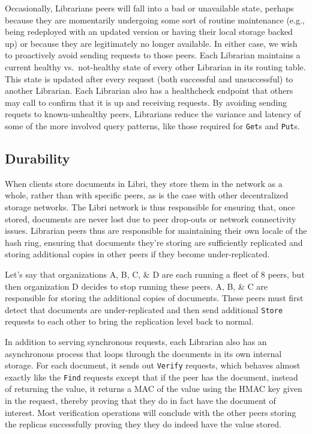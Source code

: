\documentclass[10pt]{article}
\newcommand{\ttt}[1]{\texttt{#1}}
\begin{document}
Occasionally, Librarians peers will fall into a bad or unavailable state, perhaps because they are momentarily undergoing some sort of routine maintenance (e.g., being redeployed with an updated version or having their local storage backed up) or because they are legitimately no longer available. In either case, we wish to proactively avoid sending requests to those peers. Each Librarian maintains a current healthy vs.\ not-healthy state of every other Librarian in its routing table. This state is updated after every request (both successful and unsuccessful) to another Librarian. Each Librarian also has a healthcheck endpoint that others may call to confirm that it is up and receiving requests. By avoiding sending requets to known-unhealthy peers, Librarians reduce the variance and latency of some of the more involved query patterns, like those required for \ttt{Get}s and \texttt{Put}s.

\subsection{Durability}
When clients store documents in Libri, they store them in the network as a whole, rather than with specific peers, as is the case with other decentralized storage networks\cite{bittorrent-review,ipfs}. The Libri network is thus responsible for ensuring that, once stored, documents are never lost due to peer drop-outs or network connectivity issues. Librarian peers thus are responsible for maintaining their own locale of the hash ring, ensuring that documents they're storing are sufficiently replicated and storing additional copies in other peers if they become under-replicated. 

Let's say that organizations A, B, C, \& D are each running a fleet of 8 peers, but then organization D decides to stop running these peers. A, B, \& C are responsible for storing the additional copies of documents. These peers must first detect that documents are under-replicated and then send additional \ttt{Store} requests to each other to bring the replication level back to normal. 

In addition to serving synchronous requests, each Librarian also has an asynchronous process that loops through the documents in its own internal storage. For each document, it sends out \ttt{Verify} requests, which behaves almost exactly like the \texttt{Find} requests except that if the peer has the document, instead of returning the value, it returns a MAC of the value using the HMAC key given in the request, thereby proving that they do in fact have the document of interest. Most verification operations will conclude with the other peers storing the replicas successfully proving they they do indeed have the value stored. 
\end{document}
